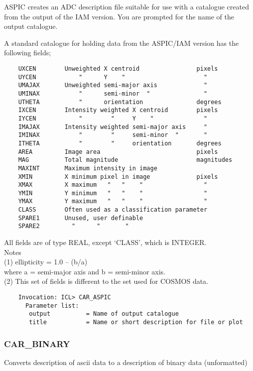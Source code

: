 ASPIC creates an ADC description file suitable for use with a
catalogue created from the output of the IAM version.
You are prompted for the name of the output catalogue.

A standard catalogue for holding data from the ASPIC/IAM version 
has the following fields;
\begin{verbatim}
    UXCEN        Unweighted X centroid                pixels
    UYCEN            "      Y    "                      "   
    UMAJAX       Unweighted semi-major axis             "   
    UMINAX           "      semi-minor  "               "   
    UTHETA           "      orientation               degrees
    IXCEN        Intensity weighted X centroid        pixels
    IYCEN            "        "     Y    "              "   
    IMAJAX       Intensity weighted semi-major axis     "   
    IMINAX           "        "     semi-minor  "       "   
    ITHETA           "        "     orientation       degrees
    AREA         Image area                           pixels
    MAG          Total magnitude                      magnitudes
    MAXINT       Maximum intensity in image
    XMIN         X minimum pixel in image             pixels
    XMAX         X maximum   "   "    "                 "   
    YMIN         Y minimum   "   "    "                 "   
    YMAX         Y maximum   "   "    "                 "   
    CLASS        Often used as a classification parameter
    SPARE1       Unused, user definable
    SPARE2         "      "       "   
 \end{verbatim}
 All fields are of type REAL, except `CLASS', which is INTEGER.\\
 Notes\\
 (1)  ellipticity = 1.0 -- (b/a)\\
      where   a = semi-major axis and b = semi-minor axis.\\
 (2)  This set of fields is different to the set used for COSMOS data.
\begin{verbatim}
    Invocation: ICL> CAR_ASPIC
      Parameter list:
       output          = Name of output catalogue
       title           = Name or short description for file or plot
\end{verbatim}
 
\subsubsection{CAR\_BINARY}

Converts description of ascii data to a description of binary data (unformatted)

